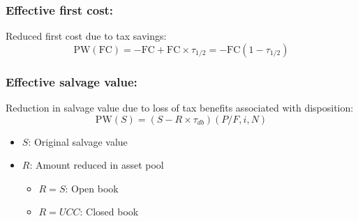 \subsubsection{Effective first cost:}
    \begin{definition}
        Reduced first cost due to tax savings:
        \begin{equation}
            \text{PW}(\text{FC}) = - \text{FC} + \text{FC} \times \tau_{1/2} = -\text{FC}(1 - \tau_{1/2})
        \end{equation}
    \end{definition}

\subsubsection{Effective salvage value:}
    \begin{definition}
        Reduction in salvage value due to loss of tax benefits associated with disposition:
        \begin{equation}
            \text{PW}(S) = (S - R \times \tau_{db}) (P/F, i, N)
        \end{equation}
        
        \begin{itemize}
            \item \(S\): Original salvage value 
            \item \(R\): Amount reduced in asset pool
            \begin{itemize}
                \item \(R=S\): Open book 
                \item \(R=UCC\): Closed book
            \end{itemize}
        \end{itemize}
    \end{definition}

